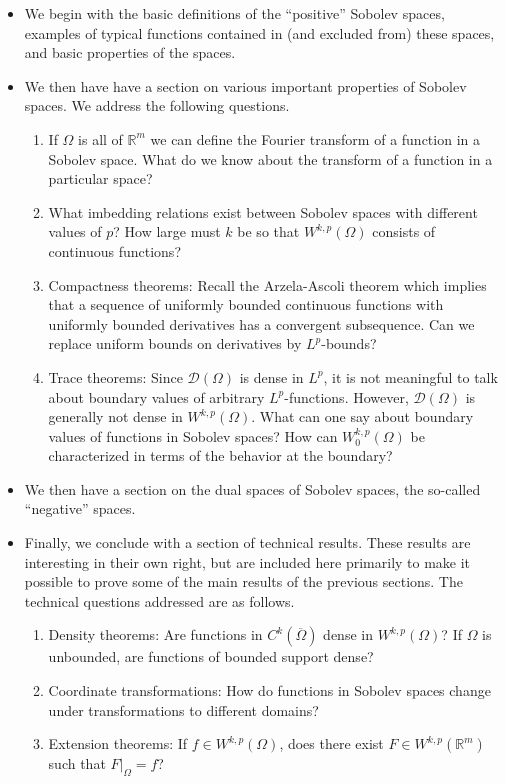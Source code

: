 \begin{itemize}
\item We begin with the basic definitions of the ``positive'' Sobolev spaces, examples of typical functions contained in (and excluded from) these spaces, and basic properties of the spaces.
\item We then have have a section on various important properties of Sobolev spaces. We address the following questions.
\begin{enumerate}
\item If $\Omega$ is all of $\mathbb{R}^m$ we can define the Fourier transform of a function in a Sobolev space. What do we know about the transform of a function in a particular space?
\item What imbedding relations exist between Sobolev spaces with different values of $p$? How large must $k$ be so that $W^{k,p}(\Omega)$ consists of continuous functions?
\item Compactness theorems: Recall the Arzela-Ascoli theorem which implies that a sequence of uniformly bounded continuous functions with uniformly bounded derivatives has a convergent subsequence. Can we replace uniform bounds on derivatives by $L^p$-bounds?
\item Trace theorems: Since $\mathcal{D}(\Omega)$ is dense in $L^p$, it is not meaningful to talk about boundary values of arbitrary $L^p$-functions. However, $\mathcal{D}(\Omega)$ is generally not dense in $W^{k,p}(\Omega)$. What can one say about boundary values of functions in Sobolev spaces? How can $W_0^{k,p}(\Omega)$ be characterized in terms of the behavior at the boundary?
\end{enumerate}
\item We then have a section on the dual spaces of Sobolev spaces, the so-called ``negative'' spaces.
\item Finally, we conclude with a section of technical results. These results are interesting in their own right, but are included here primarily to make it possible to prove some of the main results of the previous sections. The technical questions addressed are as follows.
\begin{enumerate}
\item Density theorems: Are functions in $C^k(\overline\Omega)$ dense in $W^{k,p}(\Omega)$? If $\Omega$ is unbounded, are functions of bounded support dense?
\item Coordinate transformations: How do functions in Sobolev spaces change under transformations to different domains?
\item Extension theorems: If $f\in W^{k,p}(\Omega)$, does there exist $F\in W^{k,p}(\mathbb{R}^m)$ such that $F|_{\Omega}=f$?
\end{enumerate}
\end{itemize}

